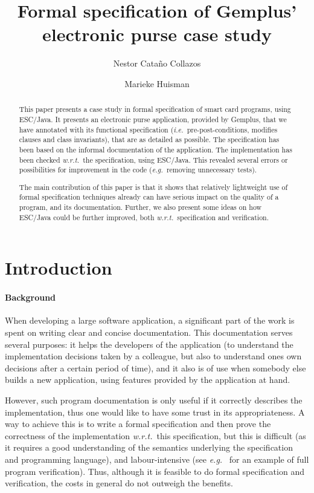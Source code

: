 \documentclass[a4paper]{llncs}
\title{Formal specification of Gemplus' electronic purse case study}
\author{
  Nestor Cata\~no Collazos
\and
  Marieke Huisman
}
\institute{
  INRIA Sophia-Antipolis, France \\ 
  \email{\{Nestor.Catano, Marieke.Huisman\}@sophia.inria.fr}
}
\begin{document}
%

\maketitle


\begin{abstract}
This paper presents a case study in formal specification of smart card
programs, using ESC/Java. It presents an electronic purse application,
provided by Gemplus, that we have annotated with its functional
specification (\emph{i.e.}~pre-post-conditions, modifies clauses and
class invariants), that are as detailed as possible. The specification
has been based on the informal documentation of the application. The
implementation has been checked \emph{w.r.t.}~the specification, using
ESC/Java.  This revealed several errors or possibilities for
improvement in the code (\emph{e.g.}~removing unnecessary tests). 

The main contribution of this paper is that it shows that relatively
lightweight use of formal specification techniques already can have
serious impact on the quality of a program, and its
documentation. Further, we also present some ideas on how ESC/Java
could be further improved, both
\emph{w.r.t.}~specification and verification.
\end{abstract}

\section{Introduction}
\label{SectIntro}

\paragraph{Background}
When developing a large software application, a significant part of
the work is spent on writing clear and concise documentation. This
documentation serves several purposes: it helps the developers of the
application (to understand the implementation decisions taken by a
colleague, but also to understand ones own decisions after a certain
period of time), and it also is of use when somebody else builds a new
application, using features provided by the application at hand.

However, such program documentation is only useful if it correctly
describes the implementation, thus one would like to have some trust
in its appropriateness. A way to achieve this is to write a formal
specification and then prove the correctness of the implementation
\emph{w.r.t.}~this specification, but this is difficult (as it
requires a good understanding of the semantics underlying the
specification and programming language), and labour-intensive (see
\emph{e.g.}~\cite{HuismanJB00a} for an example of full program
verification). Thus, although it is feasible to do formal
specification and verification, the costs in general do not outweigh
the benefits.
\end{document}
